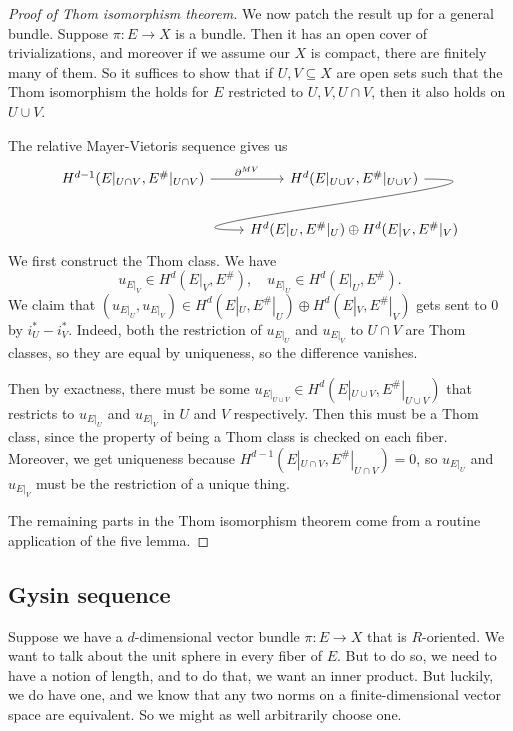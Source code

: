 \documentclass[a4paper]{article}
\begin{document}
\begin{proof}[Proof of Thom isomorphism theorem]
  \separator

  We now patch the result up for a general bundle. Suppose $\pi: E \to X$ is a bundle. Then it has an open cover of trivializations, and moreover if we assume our $X$ is compact, there are finitely many of them. So it suffices to show that if $U, V \subseteq X$ are open sets such that the Thom isomorphism the holds for $E$ restricted to $U, V, U \cap V$, then it also holds on $U \cup V$.

  The relative Mayer-Vietoris sequence gives us
  \[
    \begin{tikzcd}
      H^{d - 1}(E|_{U \cap V}, E^\#|_{U \cap V}) \ar[r, "\partial^{MV}"] & H^d(E|_{U\cup V}, E^\#|_{U\cup V}) \ar[out=0, in=180, looseness=2, overlay, d]\\
      & H^d(E|_U, E^\#|_U) \oplus H^d(E|_V, E^\#|_V) %
    \end{tikzcd}
  \]
  We first construct the Thom class. We have
  \[
    u_{E|_V} \in H^d(E|_V, E^\#),\quad u_{E|_U} \in H^d(E|_U, E^\#).
  \]
  We claim that $(u_{E|_U}, u_{E|_V}) \in H^d(E|_U, E^\#|_U) \oplus H^d(E|_V, E^\#|_V)$ gets sent to $0$ by $i_U^* - i_V^*$. Indeed, both the restriction of $u_{E|_U}$ and $u_{E|_V}$ to $U \cap V$ are Thom classes, so they are equal by uniqueness, so the difference vanishes.

  Then by exactness, there must be some $u_{E|_{U\cup V}} \in H^d(E|_{U \cup V}, E^\#|_{U \cup V})$ that restricts to $u_{E|_U}$ and $u_{E|_V}$ in $U$ and $V$ respectively. Then this must be a Thom class, since the property of being a Thom class is checked on each fiber. Moreover, we get uniqueness because $H^{d - 1}(E|_{U \cap V}, E^\#|_{U \cap V}) = 0$, so $u_{E|_U}$ and $u_{E|_V}$ must be the restriction of a unique thing.


  The remaining parts in the Thom isomorphism theorem come from a routine application of the five lemma.
\end{proof}

\subsection{Gysin sequence}
Suppose we have a $d$-dimensional vector bundle $\pi: E \to X$ that is $R$-oriented. We want to talk about the unit sphere in every fiber of $E$. But to do so, we need to have a notion of length, and to do that, we want an inner product. But luckily, we do have one, and we know that any two norms on a finite-dimensional vector space are equivalent. So we might as well arbitrarily choose one.
\end{document}
